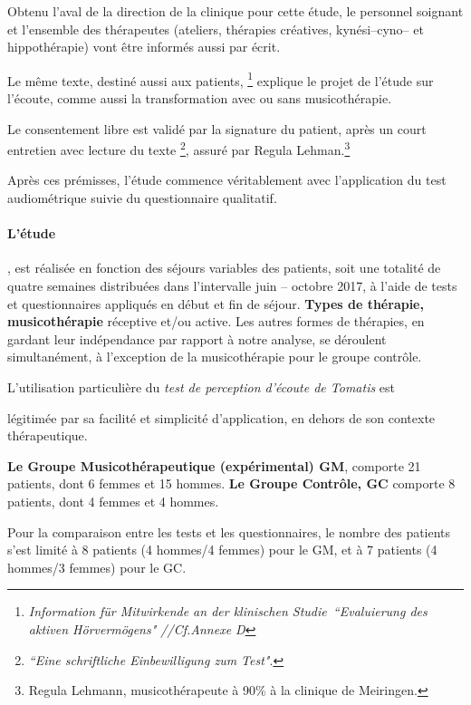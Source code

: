 Obtenu l'aval de la direction de la
clinique pour cette étude,  le personnel soignant et l'ensemble des
thérapeutes (ateliers, thérapies créatives, kynési--cyno--
et hippothérapie) vont être informés aussi par écrit.


Le même texte, destiné aussi aux
patients, \footnote{ \emph{Information für Mitwirkende an der klinischen
  Studie\  ``Evaluierung des aktiven Hörvermögens" //Cf.Annexe D}
} explique le projet de l'étude sur l'écoute, comme aussi la transformation
avec ou sans musicothérapie.


Le consentement libre est validé par la signature du patient, après
un court entretien avec lecture du texte \footnote{\emph{``Eine schriftliche Einbewilligung zum
    Test"}.}, assuré par  Regula Lehman.\footnote{Regula
  Lehmann, musicothérapeute  à 90\%  à la clinique de Meiringen.} 


Après ces prémisses, l'étude commence véritablement avec l'application du test
audiométrique suivie du questionnaire qualitatif.

\paragraph{L'étude}, est
réalisée en fonction des séjours variables des patients, soit une
totalité  de quatre semaines
distribuées dans l'intervalle juin --
octobre 2017,  à l'aide de tests et questionnaires appliqués en début
et fin de séjour.
\textbf{Types de thérapie, musicothérapie} réceptive et/ou active.
Les autres formes de thérapies, en gardant
leur indépendance par rapport à notre analyse, se déroulent simultanément, à
l'exception de la musicothérapie pour le groupe contrôle.

L'utilisation particulière du \textit{test de perception d'écoute de Tomatis}  est

légitimée par sa facilité et  simplicité d'application, en dehors de
son contexte thérapeutique.






\textbf{Le Groupe Musicothérapeutique (expérimental) GM}, comporte 21
patients, dont 6
femmes et 15 hommes.
\textbf{Le  Groupe Contrôle, GC} comporte 8 patients, dont 4 femmes et 4 hommes.


Pour la comparaison entre les tests et les questionnaires, le nombre
des patients s'est limité  à 8
patients (4 hommes/4 femmes) pour le GM, et à 7 patients (4 hommes/3
femmes) pour le GC.





